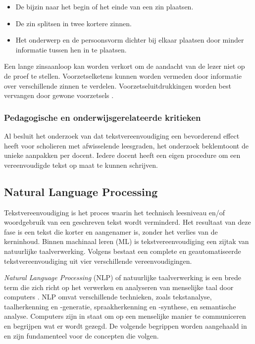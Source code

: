 \begin{itemize}
	\item De bijzin naar het begin of het einde van een zin plaatsen.
	\item De zin splitsen in twee kortere zinnen.
	\item Het onderwerp en de persoonsvorm dichter bij elkaar plaatsen door minder informatie tussen hen in te plaatsen.
\end{itemize}

Een lange zinsaanloop kan worden verkort om de aandacht van de lezer niet op de proef te stellen. Voorzetselketens kunnen worden vermeden door informatie over verschillende zinnen te verdelen. Voorzetseluitdrukkingen worden best vervangen door gewone voorzetsels \autocite{Bosmans2022c}.

\subsubsection{Pedagogische en onderwijsgerelateerde kritieken}

Al besluit het onderzoek van \textcite{Crossley2012} dat tekstvereenvoudiging een bevorderend effect heeft voor scholieren met afwisselende leesgraden, het onderzoek beklemtoont de unieke aanpakken per docent. Iedere docent heeft een eigen procedure om een vereenvoudigde tekst op maat te kunnen schrijven.

\subsection{Natural Language Processing}

Tekstvereenvoudiging is het proces waarin het technisch leesniveau en/of woordgebruik van een geschreven tekst wordt verminderd. Het resultaat van deze fase is een tekst die korter en aangenamer is, zonder het verlies van de kerninhoud. Binnen machinaal leren (ML) is tekstvereenvoudiging een zijtak van natuurlijke taalverwerking. \autocite{Siddharthan2006} Volgens \autocite{Siddharthan2014} bestaat een complete en geautomatiseerde tekstvereenvoudiging uit vier verschillende vereenvoudigingen. 

\textit{Natural Language Processing} (NLP) of natuurlijke taalverwerking is een brede term die zich richt op het verwerken en analyseren van menselijke taal door computers \autocite{Eisenstein2019}. NLP omvat verschillende technieken, zoals tekstanalyse, taalherkenning en -generatie, spraakherkenning en -synthese, en semantische analyse. Computers zijn in staat om op een menselijke manier te communiceren en begrijpen wat er wordt gezegd. De volgende begrippen worden aangehaald in \textcite{Sohom2019, Eisenstein2019} en zijn fundamenteel voor de concepten die volgen.

